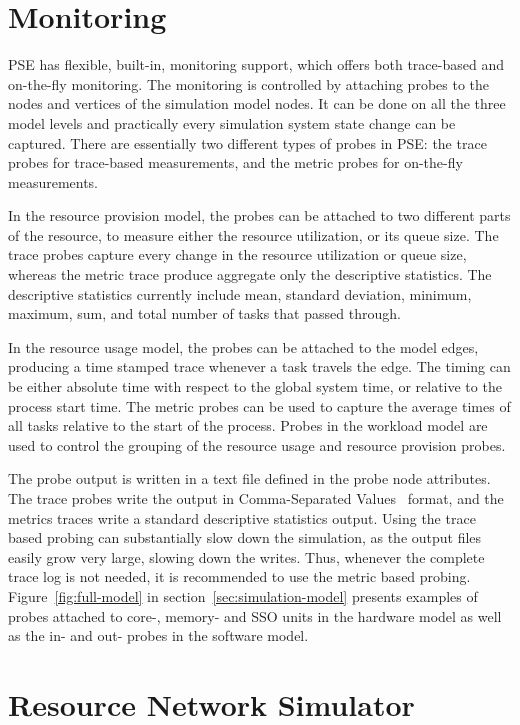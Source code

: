 \section{Monitoring}

PSE has flexible, built-in, monitoring support, which offers both trace-based and on-the-fly monitoring. The monitoring is controlled by attaching probes to the nodes and vertices of the simulation model nodes. It can be done on all the three model levels and practically every simulation system state change can be captured. There are essentially two different types of probes in PSE: the trace probes for trace-based measurements, and the metric probes for on-the-fly measurements.

In the resource provision model, the probes can be attached to two different parts of the resource, to measure either the resource utilization, or its queue size. The trace probes capture every change in the resource utilization or queue size, whereas the metric trace produce aggregate only the descriptive statistics. The descriptive statistics currently include mean, standard deviation, minimum, maximum, sum, and total number of tasks that passed through.

In the resource usage model, the probes can be attached to the model edges, producing a time stamped trace whenever a task travels the edge. The timing can be either absolute time with respect to the global system time, or relative to the process start time. The metric probes can be used to capture the average times of all tasks relative to the start of the process. Probes in the workload model are used to control the grouping of the resource usage and resource provision probes.

The probe output is written in a text file defined in the probe node attributes. The trace probes write the output in Comma-Separated Values~\cite{Shafranovic:2005:CSV} format, and the metrics traces write a standard descriptive statistics output. Using the trace based probing can substantially slow down the simulation, as the output files easily grow very large, slowing down the writes. Thus, whenever the complete trace log is not needed, it is recommended to use the metric based probing. Figure~\ref{fig:full-model} in section~\ref{sec:simulation-model} presents examples of probes attached to core-, memory- and SSO units in the hardware model as well as the in- and out- probes in the software model.

\section{Resource Network Simulator}
\label{sec:resource-network-simulator}

